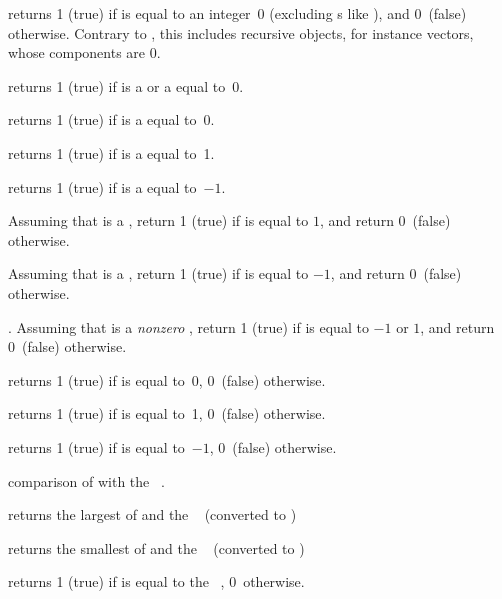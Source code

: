  returns 1 (true) if  is equal
to an integer~0 (excluding s like ), and 0~(false)
otherwise. Contrary to , this includes recursive objects, for
instance vectors, whose components are $0$.

 returns 1 (true) if  is a  or
a  equal to~0.

 returns 1 (true) if  is a 
equal to~0.

 returns 1 (true) if  is a 
equal to~1.

 returns 1 (true) if  is a 
equal to~$-1$.

Assuming that  is a , return 1 (true) if  is equal to
$1$, and return 0~(false) otherwise.

Assuming that  is a , return 1 (true) if  is equal to
$-1$, and return 0~(false) otherwise.

. Assuming that  is a
\emph{nonzero} , return 1 (true) if  is equal to $-1$ or
$1$, and return 0~(false) otherwise.

 returns 1 (true) if  is equal to~0, 0~(false)
otherwise.

 returns 1 (true) if  is equal to~1, 0~(false)
otherwise.

 returns 1 (true) if  is equal to~$-1$,
0~(false) otherwise.



 comparison of  with the
~.


 returns the largest of  and
the ~ (converted to )


 returns the smallest of  and the
~ (converted to )


 returns 1 (true) if  is equal to
the ~, 0~otherwise.

